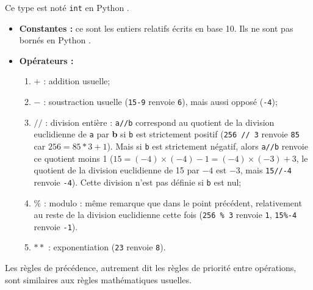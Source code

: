\begin{defi}[Entiers]
Ce type est noté \texttt{int} en Python .\\
\begin{itemize}
\item \textbf{Constantes :} ce sont les entiers relatifs écrits en base 10. Ils ne sont pas 
bornés en Python .
\item \textbf{Opérateurs :}
\begin{enumerate}
 \item $+$ : addition usuelle;
 \item $-$ : soustraction usuelle (\texttt{15-9} renvoie \texttt{6}), mais aussi opposé (\texttt{-4});
\item  $//$ : {division entière} : \texttt{a//b} correspond au quotient de la 
division euclidienne de \texttt{a} par \textbf{b} si \texttt{b} est strictement positif 
(\texttt{256 // 3} renvoie \texttt{85} car $256 = 85*3 + 1$). Mais si \texttt{b} est strictement 
négatif, alors \texttt{a//b} renvoie ce quotient moins 1 ($15 = (-4)\times(-4)-1=(-4)\times(-3)+3$, 
le quotient de la division euclidienne de 15 par $-4$ est $-3$, mais \texttt{15//-4} renvoie 
\texttt{-4}). Cette division n'est pas définie si \texttt{b} est nul;
\item $\%$ : {modulo} : même remarque que dans le point précédent, relativement au reste de la 
division euclidienne cette fois (\texttt{256 \% 3} renvoie 
\texttt{1}, \texttt{15\%-4} renvoie \texttt{-1}).
\item $**$ : exponentiation (\texttt{2\raisebox{0.3ex}{**}3} renvoie \texttt{8}).
\end{enumerate}
\end{itemize}
Les {règles de précédence}, autrement dit les règles de priorité entre opérations, sont 
similaires aux règles mathématiques usuelles.
\end{defi}
